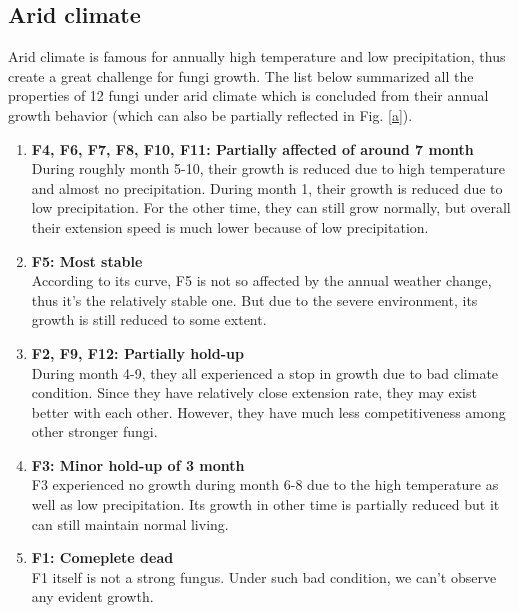 \documentclass[a4paper,12pt]{article}
\begin{document}
\newpage
\subsection{Arid climate}
Arid climate is famous for annually high temperature and low precipitation, thus create a great challenge for fungi growth. The list below summarized all the properties of 12 fungi under arid climate which is concluded from their annual growth behavior (which can also be partially reflected in Fig. \ref{a}).

\begin{enumerate}
\setlength{\itemsep}{0ex} %
\item \textbf{F4, F6, F7, F8, F10, F11:  Partially affected of around 7 month}\\
During roughly month 5-10, their growth is reduced due to high temperature and almost no precipitation. During month 1, their growth is reduced due to low precipitation. For the other time, they can still grow normally, but overall their extension speed is much lower because of low precipitation. 
\item \textbf{F5: Most stable}\\
According to its curve, F5 is not so affected by the annual weather change, thus it's the relatively stable one. But due to the severe environment, its growth is still reduced to some extent.
\item \textbf{F2, F9, F12: Partially hold-up}\\
During month 4-9, they all experienced a stop in growth due to bad climate condition. Since they have relatively close extension rate, they may exist better with each other. However, they have much less competitiveness among other stronger fungi.
\item \textbf{F3: Minor hold-up of 3 month}\\
F3 experienced no growth during month 6-8 due to the high temperature as well as low precipitation.  Its growth in other time is partially reduced but it can still maintain normal living. 
\item \textbf{F1: Comeplete dead}\\
F1 itself is not a strong fungus. Under such bad condition, we can't observe any evident growth.
\end{enumerate}
\end{document}
